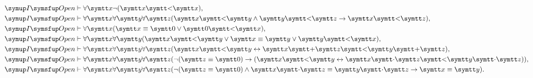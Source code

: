 \begin{Thm}
\begin{align}
		\OpenFormulaInduction & \provable \forall \obj{x}
		\lnot \paren{\obj{x} \obj{<} \obj{x}},
		\label{eq:iopennonreflexivityraw}                                                                                                                                                                 \\
		\OpenFormulaInduction & \provable \forall \obj{x} \forall \obj{y} \forall \obj{z}
		\paren{\obj{x} \obj{<} \obj{y} \land \obj{y} \obj{<} \obj{z} \to \obj{x} \obj{<} \obj{z}},
		\label{eq:iopentransitionraw}                                                                                                                                                                     \\
		\OpenFormulaInduction & \provable \forall \obj{x}
		\paren{\obj{x} \objeq \obj{0} \lor \obj{0} \obj{<} \obj{x}},
		\label{eq:iopen0minimum}                                                                                                                                                                          \\
		\OpenFormulaInduction & \provable \forall \obj{x} \forall \obj{y}
		\paren{\obj{x} \obj{<} \obj{y} \lor \obj{x} \objeq \obj{y} \lor \obj{y} \obj{<} \obj{x}},
		\label{eq:iopenlinerorder}                                                                                                                                                                        \\
		\OpenFormulaInduction & \provable \forall \obj{x} \forall \obj{y} \forall \obj{z}
		\paren{\obj{x} \obj{<} \obj{y} \formulaequiv \obj{x} \obj{+} \obj{z} \obj{<} \obj{y} \obj{+} \obj{z}},
		\label{eq:iopencalcorderaddition}                                                                                                                                                                 \\
		\OpenFormulaInduction & \provable \forall \obj{x} \forall \obj{y} \forall \obj{z}
		\paren{\lnot \paren{\obj{z} \objeq \obj{0}} \to \paren{\obj{x} \obj{<} \obj{y} \formulaequiv \obj{x} \obj{\cdot} \obj{z} \obj{<} \obj{y} \obj{\cdot} \obj{z}}},
		\label{eq:iopencalcordermult}                                                                                                                                                                     \\
		\OpenFormulaInduction & \provable \forall \obj{x} \forall \obj{y} \forall \obj{z}
		\paren{\lnot \paren{\obj{z} \objeq \obj{0}} \land \obj{x} \obj{\cdot} \obj{z} \objeq \obj{y} \obj{\cdot} \obj{z} \to \obj{x} \objeq \obj{y}}.
		\label{eq:iopendivision}
	\end{align}
\end{Thm}

